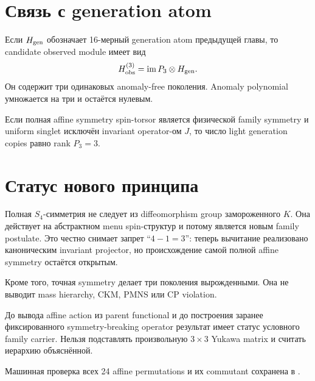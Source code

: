\section{Связь с generation atom}

Если \(H_{\rm gen}\) обозначает 16-мерный generation atom предыдущей главы,
то candidate observed module имеет вид
\begin{equation}
H_{\rm obs}^{(3)}=\operatorname{im}P_3\otimes H_{\rm gen}.
\end{equation}
Он содержит три одинаковых anomaly-free поколения. Anomaly polynomial
умножается на три и остаётся нулевым.

\begin{proposition}
Если полная affine symmetry spin-torsor является физической family symmetry
и uniform singlet исключён invariant operator-ом \(J\), то число light
generation copies равно rank \(P_3=3\).
\end{proposition}

\section{Статус нового принципа}

Полная \(S_4\)-симметрия не следует из diffeomorphism group замороженного
\(K\). Она действует на абстрактном menu spin-структур и потому является
новым family postulate. Это честно снимает запрет ``\(4-1=3\)'': теперь
вычитание реализовано каноническим invariant projector, но происхождение
самой полной affine symmetry остаётся открытым.

Кроме того, точная symmetry делает три поколения вырожденными. Она не
выводит mass hierarchy, CKM, PMNS или CP violation.

\begin{nogocriterion}
До вывода affine action из parent functional и до построения заранее
фиксированного symmetry-breaking operator результат имеет статус
условного family carrier. Нельзя подставлять произвольную \(3\times3\)
Yukawa matrix и считать иерархию объяснённой.
\end{nogocriterion}

Машинная проверка всех 24 affine permutations и их commutant сохранена в
.